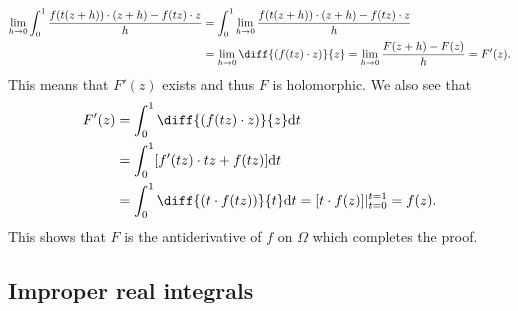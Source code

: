 \documentclass[11pt,a4paper]{article}
\begin{document}
\begin{solution}
  \begin{align*}
    \lim_{h \to 0}
    \int_{0}^{1} \frac{f(t(z + h)) \cdot (z + h) - f(tz) \cdot z}{h} &=
    \int_{0}^{1} 
    \lim_{h \to 0} \frac{f(t(z + h)) \cdot (z + h) - f(tz) \cdot z}{h} \\ &=
    \lim_{h \to 0} \diff{{(f(tz) \cdot z)}}{z} =
    \lim_{h \to 0}  \frac{F(z + h) - F(z)}{h} = F'(z).
  \end{align*}
  This means that $F'(z)$ exists and thus $F$ is holomorphic.
  We also see that
  \begin{align*}
    F'(z) &= \int_{0}^{1} \diff{{(f(tz) \cdot z)}}{z} \dt \\
          &= \int_{0}^{1} [f'(tz) \cdot tz + f(tz)] \dt \\
          &= \int_{0}^{1} \diff{{(t \cdot f(tz))}}{t} \dt
          = [t \cdot f(z)] \vert_{t=0}^{t=1} = f(z).
  \end{align*}
  This shows that $F$ is the antiderivative of $f$ on $\Omega$ which completes
  the proof.
\end{solution}

\subsection{Improper real integrals}
\end{document}
